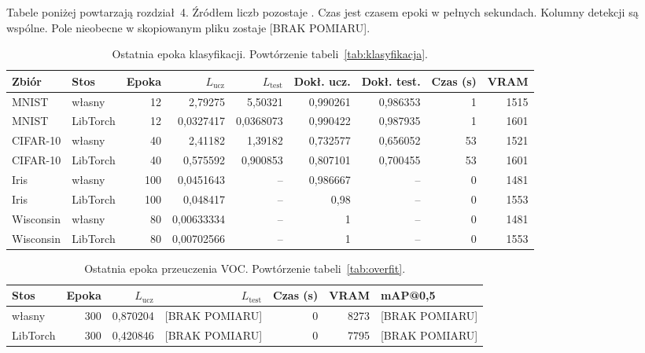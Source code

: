 Tabele poniżej powtarzają rozdział~4. Źródłem liczb pozostaje . Czas jest czasem epoki w pełnych sekundach. Kolumny detekcji są wspólne. Pole nieobecne w skopiowanym pliku zostaje [BRAK POMIARU].

\begin{table}[ht]
\centering
\caption{Ostatnia epoka klasyfikacji. Powtórzenie tabeli~\ref{tab:klasyfikacja}.}
\label{tab:zal-klasyfikacja}
\small
\begin{tabular}{llrrrrrrr}
\toprule
Zbiór & Stos & Epoka & $L_{\mathrm{ucz}}$ & $L_{\mathrm{test}}$ & Dokł. ucz. & Dokł. test. & Czas (s) & VRAM \\
\midrule
MNIST & własny & 12 & 2{,}79275 & 5{,}50321 & 0{,}990261 & 0{,}986353 & 1 & 1515 \\
MNIST & LibTorch & 12 & 0{,}0327417 & 0{,}0368073 & 0{,}990422 & 0{,}987935 & 1 & 1601 \\
\midrule
CIFAR-10 & własny & 40 & 2{,}41182 & 1{,}39182 & 0{,}732577 & 0{,}656052 & 53 & 1521 \\
CIFAR-10 & LibTorch & 40 & 0{,}575592 & 0{,}900853 & 0{,}807101 & 0{,}700455 & 53 & 1601 \\
\midrule
Iris & własny & 100 & 0{,}0451643 & -- & 0{,}986667 & -- & 0 & 1481 \\
Iris & LibTorch & 100 & 0{,}048417 & -- & 0{,}98 & -- & 0 & 1553 \\
\midrule
Wisconsin & własny & 80 & 0{,}00633334 & -- & 1 & -- & 0 & 1481 \\
Wisconsin & LibTorch & 80 & 0{,}00702566 & -- & 1 & -- & 0 & 1553 \\
\bottomrule
\end{tabular}
\end{table}

\begin{table}[ht]
\centering
\caption{Ostatnia epoka przeuczenia VOC. Powtórzenie tabeli~\ref{tab:overfit}.}
\label{tab:zal-overfit}
\small
\begin{tabular}{lrrrrrl}
\toprule
Stos & Epoka & \(L_{\mathrm{ucz}}\) & \(L_{\mathrm{test}}\) & Czas (s) & VRAM & mAP@0,5 \\
\midrule
własny & 300 & 0{,}870204 & [BRAK POMIARU] & 0 & 8273 & [BRAK POMIARU] \\
LibTorch & 300 & 0{,}420846 & [BRAK POMIARU] & 0 & 7795 & [BRAK POMIARU] \\
\bottomrule
\end{tabular}
\end{table}

